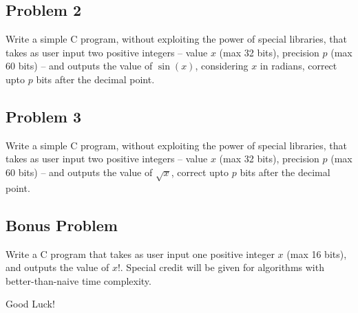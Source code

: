 \documentclass[11pt,a4paper]{article}
\begin{document}
\subsection*{Problem 2}

Write a simple C program, without exploiting the power of special libraries, that takes as user input two positive integers -- value $x$ (max 32 bits), precision $p$ (max 60 bits) -- and outputs the value of $\sin(x)$, considering $x$ in radians, correct upto $p$ bits after the decimal point.

\subsection*{Problem 3}

Write a simple C program, without exploiting the power of special libraries, that takes as user input two positive integers -- value $x$ (max 32 bits), precision $p$ (max 60 bits) -- and outputs the value of $\sqrt{x}$, correct upto $p$ bits after the decimal point.

\subsection*{Bonus Problem}

Write a C program that takes as user input one positive integer $x$ (max 16 bits), and outputs the value of $x!$. Special credit will be given for algorithms with better-than-naive time complexity.

\vfill

\hfill Good Luck! {\Large\smiley{}}
\end{document}
